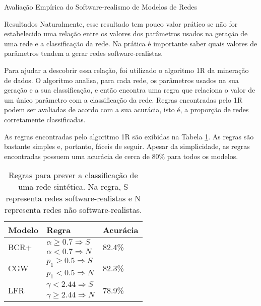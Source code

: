 \begin{section}{Avaliação Empírica do Software-realismo de Modelos de Redes}
\begin{subsection}{Resultados}
Naturalmente, esse resultado tem pouco valor prático se não for estabelecido uma relação entre os valores dos parâmetros usados na geração de uma rede e a classificação da rede. Na prática é importante saber quais valores de parâmetros tendem a gerar redes software-realistas.

Para ajudar a descobrir essa relação, foi utilizado o algoritmo 1R \cite{OneR} da mineração de dados. O algoritmo analisa, para cada rede, os parâmetros usados na sua geração e a sua classificação, e então encontra uma regra que relaciona o valor de um único parâmetro com a classificação da rede. Regras encontradas pelo 1R podem ser avaliadas de acordo com a sua acurácia, isto é, a proporção de redes corretamente classificadas.

As regras encontradas pelo algoritmo 1R são exibidas na Tabela \ref{tab:rules}. As regras são bastante simples e, portanto, fáceis de seguir. Apesar da simplicidade, as regras encontradas possuem uma acurácia de cerca de 80\% para todos os modelos.

\begin{table}
\caption{Regras para prever a classificação de uma rede sintética. Na regra, S representa redes software-realistas e N representa redes não software-realistas.}
\centering
\begin{tabular}{|l|l|l|}
\hline
Modelo & Regra & Acurácia \\
\hline 
\hline
\multirow{2}{*}{BCR+}
     & $\alpha \ge 0.7 \Rightarrow S$ & \multirow{2}{*}{82.4\%}  \\ 
     & $\alpha < 0.7 \Rightarrow N$ & \\ 
\hline
\multirow{2}{*}{CGW}
     & $p_1 \ge 0.5 \Rightarrow S$ & \multirow{2}{*}{82.3\%} \\  
     & $p_1 < 0.5 \Rightarrow N$ & \\  
\hline
\multirow{2}{*}{LFR}   
     & $\gamma < 2.44 \Rightarrow S$ & \multirow{2}{*}{78.9\%} \\ 
     & $\gamma \ge 2.44 \Rightarrow N$ & \\ 
\hline
\end{tabular}
\label{tab:rules}
\end{table}

\end{subsection}

\end{section}


 
% 
% 
% 
% 
% 
% 
% 
% 
% 
